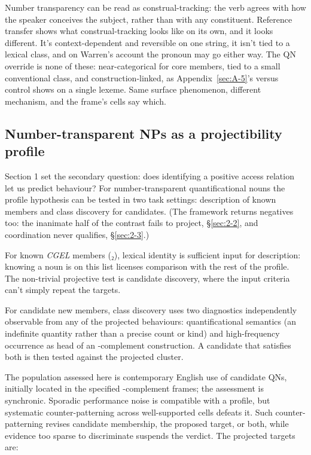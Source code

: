 Number transparency can be read as construal-tracking: the verb agrees with how the speaker conceives the subject, rather than with any constituent. Reference transfer shows what construal-tracking looks like on its own, and it looks different. It's context-dependent and reversible on one string, it isn't tied to a lexical class, and on Warren's account the pronoun may go either way. The QN override is none of these: near-categorical for core members, tied to a small conventional class, and construction-linked, as Appendix~\ref{sec:A-5}'s  versus  control shows on a single lexeme. Same surface phenomenon, different mechanism, and the frame's cells say which.

\subsection{Number-transparent NPs as a projectibility profile}\label{sec:2-4}

Section 1 set the secondary question: does identifying a positive access relation let us predict behaviour? For number-transparent quantificational nouns the profile hypothesis can be tested in two task settings: description of known members and class discovery for candidates. (The framework returns negatives too: the inanimate half of the  contrast fails to project, §\ref{sec:2-2}, and coordination never qualifies, §\ref{sec:2-3}.)

For known \textit{CGEL} members (₂), lexical identity is sufficient input for description: knowing a noun is on this list licenses comparison with the rest of the profile. The non-trivial projective test is candidate discovery, where the input criteria can't simply repeat the targets.

For candidate new members, class discovery uses two diagnostics independently observable from any of the projected behaviours: quantificational semantics (an indefinite quantity rather than a precise count or kind) and high-frequency occurrence as head of an -complement construction. A candidate that satisfies both is then tested against the projected cluster.

The population assessed here is contemporary English use of candidate QNs, initially located in the specified -complement frames; the assessment is synchronic. Sporadic performance noise is compatible with a profile, but systematic counter-patterning across well-supported cells defeats it. Such counter-patterning revises candidate membership, the proposed target, or both, while evidence too sparse to discriminate suspends the verdict. The projected targets are:


